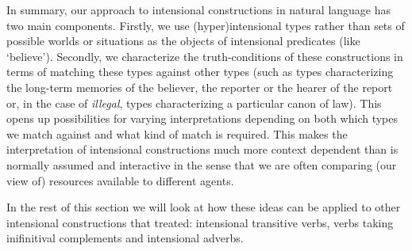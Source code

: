 
In summary, our approach to intensional constructions in natural
language has two main components.  Firstly, we use (hyper)intensional
types rather than sets of possible worlds or situations as the objects
of intensional predicates (like `believe').  Secondly, we characterize
the truth-conditions of these constructions in terms of matching these
types against other types (such as types characterizing the long-term
memories of the believer, the reporter or the hearer of the report or,
in the case of \textit{illegal}, types characterizing a particular
canon of law).  This opens up possibilities for varying
interpretations depending on both which types we match against and
what kind of match is required.  This makes the interpretation of
intensional constructions much more context dependent than is normally
assumed and interactive in the sense that we are often comparing (our
view of) resources available to different agents.

In the rest of this section we will look at how these ideas can be
applied to other intensional constructions that \cite{Montague1973}
treated:  intensional
transitive verbs, verbs taking inifinitival complements and
intensional adverbs.

